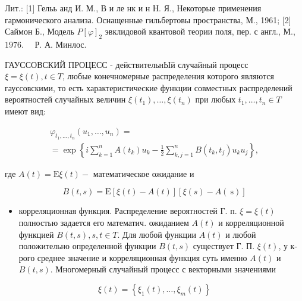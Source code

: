 \documentclass[10pt]{article}
\begin{document}
Лит.: [1] Гельь анд И. М., В и ле нк и н Н. Я., Некоторые применения гармонического анализа. Оснащенные гильбертовы пространства, М., 1961; [2] Саймон Б., Модель $P[\varphi]_{2}$ эвклидовой квантовой теории поля, пер. с англ., М., $1976 . \quad$ Р. А. Минлос.



ГАУССОВСКИЙ ПРОЦЕСС - действительнЫй случайный процесс $\xi=\xi(t), t \in T$, любые конечномерные распределения которого являются гауссовскими, то есть характеристические функции совместных распределений вероятностей случайных величин $\xi\left(t_{1}\right), \ldots, \xi\left(t_{n}\right)$ при любых $t_{1}, \ldots, t_{n} \in T$ имеют вид:



\[

\begin{gathered}

\varphi_{t_{1}, \ldots, t_{n}}\left(u_{1}, \ldots, u_{n}\right)= \\

=\exp \left\{i \sum_{k=1}^{n} A\left(t_{k}\right) u_{k}-\frac{1}{2} \sum_{k, j=1}^{n} B\left(t_{k}, t_{j}\right) u_{k} u_{j}\right\},

\end{gathered}

\]



где $A(t)=\mathrm{E} \xi(t)-$ математическое ожидание и



\[

B(t, s)=\mathrm{E}[\xi(t)-A(t)][\xi(s)-A(\mathrm{~s})]

\]



\begin{itemize}

  \item корреляционная функция. Распределение вероятностей Г. п. $\xi=\xi(t)$ полностью задается его математич. ожиданием $A(t)$ и корреляционной функцией $B(t, s), s, t \in T$. Для любой функции $A(t)$ и любой положительно определенной функции $B(t, s)$ существует Г. П. $\xi(t)$, у к-рого среднее значение и корреляционная функция суть именно $A(t)$ и $B(t, s)$. Многомерный случайный процесс с векторными значениями

\end{itemize}



\[

\xi(t)=\left\{\xi_{1}(t), \ldots, \xi_{m}(t)\right\}

\]
\end{document}
